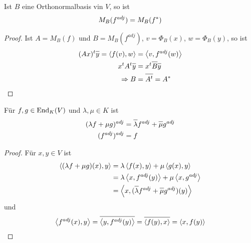 \begin{lemma}
	Ist $B$ eine Orthonormalbasis vin $V$, so ist
	\begin{align}
		M_B(f^{adj})=M_B(f^*)\notag
	\end{align}
\end{lemma}
\begin{proof}
	Ist $A=M_B(f)$ und $B=M_B(f^{adj})$, $v=\Phi_B(x)$, $w=\Phi_B(y)$, so ist
	\begin{align}
		(Ax)^t\overline{y}=\skalar{f(v)}{w}&=\skalar{v}{f^{adj}(w)}\notag \\
		x^tA^t\overline{y} &= x^t\overline{B}\overline{y} \notag \\
		\Rightarrow B&= \overline{A^t}=A^*\notag
	\end{align}
\end{proof}

\begin{lemma}
	Für $f,g\in\operatorname{End}_K(V)$ und $\lambda,\mu\in K$ ist
	\begin{align}
		(\lambda f+\mu g)^{adj} &= \overline{\lambda}f^{adj}+\overline{\mu}g^{adj}\notag \\
		(f^{adj})^{adj} &= f\notag
	\end{align}
\end{lemma}
\begin{proof}
	Für $x,y\in V$ ist
	\begin{align}
		\skalar{(\lambda f+\mu g)(x)}{y}&=\lambda\skalar{f(x)}{y}+\mu\skalar{g(x)}{y}\notag \\
		&= \lambda\skalar{x}{f^{adj}(y)}+\mu\skalar{x}{g^{adj}} \notag \\
		&= \skalar{x}{(\overline{\lambda}f^{adj}+\overline{\mu}g^{adj})(y)}\notag
	\end{align}
	und
	\begin{align}
		\skalar{f^{adj}(x)}{y}=\overline{\skalar{y}{f^{adj}(y)}}=\overline{\skalar{f(y)}{x}}=\skalar{x}{f(y)}\notag
	\end{align}
\end{proof}